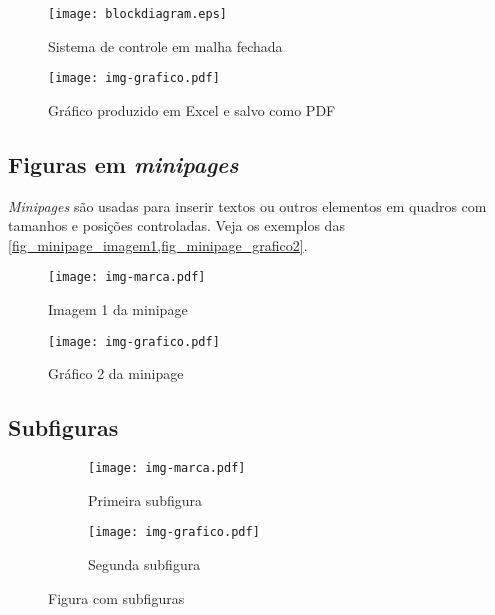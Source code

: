 \begin{figure}[htb]
    \centering
    \texttt{[image: blockdiagram.eps]}
	\caption{\label{fig_blockdiagram}Sistema de controle em malha fechada}
\end{figure}

\begin{figure}[htb]
	\begin{center}
	    \texttt{[image: img-grafico.pdf]}
	\end{center}
	\caption{\label{fig_grafico}Gráfico produzido em Excel e salvo como PDF}
\end{figure}

\subsection{Figuras em \emph{minipages}}

\emph{Minipages} são usadas para inserir textos ou outros elementos em quadros com tamanhos e posições controladas. Veja os exemplos das \cref{fig_minipage_imagem1,fig_minipage_grafico2}.

\begin{figure}[htb]
 \label{teste}
 \centering
  \begin{minipage}{0.4\textwidth}
    \centering
    \texttt{[image: img-marca.pdf]}
    \caption{Imagem 1 da minipage} \label{fig_minipage_imagem1}
  \end{minipage}
  \hfill
  \begin{minipage}{0.4\textwidth}
    \centering
    \texttt{[image: img-grafico.pdf]}
    \caption{Gráfico 2 da minipage} \label{fig_minipage_grafico2}
  \end{minipage}
\end{figure}

\subsection{Subfiguras}

\begin{figure}[H]
    \centering
	\begin{subfigure}[t]{0.4\columnwidth}
		\texttt{[image: img-marca.pdf]}
		\caption{Primeira subfigura}
		\label{fig_subfigura_imagem1}
    \end{subfigure}%
    \hfill
    \begin{subfigure}[t]{0.4\columnwidth}
		\texttt{[image: img-grafico.pdf]}
		\caption{Segunda subfigura}
		\label{fig_subfigura_grafico2}
    \end{subfigure}
    \caption{Figura com subfiguras}
    \label{fig:tau}
\end{figure}

